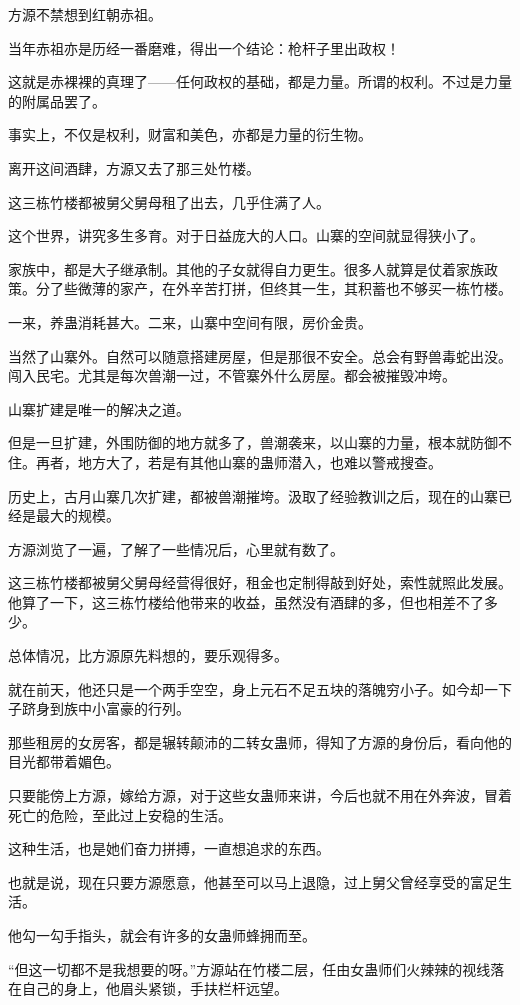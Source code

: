 \begin{this_body}
方源不禁想到红朝赤祖。

当年赤祖亦是历经一番磨难，得出一个结论：枪杆子里出政权！

这就是赤裸裸的真理了——任何政权的基础，都是力量。所谓的权利。不过是力量的附属品罢了。

事实上，不仅是权利，财富和美色，亦都是力量的衍生物。

离开这间酒肆，方源又去了那三处竹楼。

这三栋竹楼都被舅父舅母租了出去，几乎住满了人。

这个世界，讲究多生多育。对于日益庞大的人口。山寨的空间就显得狭小了。

家族中，都是大子继承制。其他的子女就得自力更生。很多人就算是仗着家族政策。分了些微薄的家产，在外辛苦打拼，但终其一生，其积蓄也不够买一栋竹楼。

一来，养蛊消耗甚大。二来，山寨中空间有限，房价金贵。

当然了山寨外。自然可以随意搭建房屋，但是那很不安全。总会有野兽毒蛇出没。闯入民宅。尤其是每次兽潮一过，不管寨外什么房屋。都会被摧毁冲垮。

山寨扩建是唯一的解决之道。

但是一旦扩建，外围防御的地方就多了，兽潮袭来，以山寨的力量，根本就防御不住。再者，地方大了，若是有其他山寨的蛊师潜入，也难以警戒搜查。

历史上，古月山寨几次扩建，都被兽潮摧垮。汲取了经验教训之后，现在的山寨已经是最大的规模。

方源浏览了一遍，了解了一些情况后，心里就有数了。

这三栋竹楼都被舅父舅母经营得很好，租金也定制得敲到好处，索性就照此发展。他算了一下，这三栋竹楼给他带来的收益，虽然没有酒肆的多，但也相差不了多少。

总体情况，比方源原先料想的，要乐观得多。

就在前天，他还只是一个两手空空，身上元石不足五块的落魄穷小子。如今却一下子跻身到族中小富豪的行列。

那些租房的女房客，都是辗转颠沛的二转女蛊师，得知了方源的身份后，看向他的目光都带着媚色。

只要能傍上方源，嫁给方源，对于这些女蛊师来讲，今后也就不用在外奔波，冒着死亡的危险，至此过上安稳的生活。

这种生活，也是她们奋力拼搏，一直想追求的东西。

也就是说，现在只要方源愿意，他甚至可以马上退隐，过上舅父曾经享受的富足生活。

他勾一勾手指头，就会有许多的女蛊师蜂拥而至。

“但这一切都不是我想要的呀。”方源站在竹楼二层，任由女蛊师们火辣辣的视线落在自己的身上，他眉头紧锁，手扶栏杆远望。


\end{this_body}
